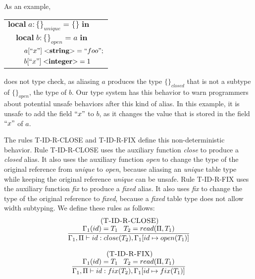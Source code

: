 \documentclass{sigplanconf}
\newcommand{\Integer}{\mathbf{integer}}
\newcommand{\String}{\mathbf{string}}
\newcommand{\mylabel}[1]{\; (\textsc{#1})}
\newcommand{\env}{\Gamma}
\newcommand{\penv}{\Pi}
\begin{document}
As an example,
\begin{center}
\begin{tabular}{lll}
\multicolumn{3}{l}{$\mathbf{local} \; a:\{\}_{unique} = \{\} \; \mathbf{in}$}\\
& \multicolumn{2}{l}{$\mathbf{local} \; b:\{\}_{open} = a \; \mathbf{in}$}\\
& & \multicolumn{1}{l}{$a[``x"] \; {<}\String{>} = ``foo";$}\\
& & \multicolumn{1}{l}{$b[``x"] \; {<}\Integer{>} = 1$}\\
\end{tabular}
\end{center}
does not type check, as aliasing $a$ produces the type $\{\}_{closed}$
that is not a subtype of $\{\}_{open}$, the type of $b$.
Our type system has this behavior to warn programmers about
potential unsafe behaviors after this kind of alias.
In this example, it is unsafe to add the field $``x"$ to $b$,
as it changes the value that is stored in the field $``x"$ of $a$.

The rules \textsc{T-ID-R-CLOSE} and \textsc{T-ID-R-FIX} define this non-deterministic behavior.
Rule \textsc{T-ID-R-CLOSE} uses the auxiliary function \emph{close} to
produce a \emph{closed} alias.
It also uses the auxiliary function \emph{open} to change the type of
the original reference from \emph{unique} to \emph{open},
because aliasing an \emph{unique} table type while keeping the original
reference \emph{unique} can be unsafe.
Rule \textsc{T-ID-R-FIX} uses the auxiliary function \emph{fix} to
produce a \emph{fixed} alias.
It also uses \emph{fix} to change the type of the original reference
to \emph{fixed}, because a \emph{fixed} table type does not allow
width subtyping.
We define these rules as follows:
\[
\begin{array}{c}
\begin{array}{c}
\mylabel{T-ID-R-CLOSE}\\
\dfrac{\env_{1}(id) = T_{1} \;\;\; T_{2} = read(\penv, T_{1})}
      {\env_{1}, \penv \vdash id:close(T_{2}), \env_{1}[id \mapsto open(T_{1})]}
\end{array}
\\ \\
\begin{array}{c}
\mylabel{T-ID-R-FIX}\\
\dfrac{\env_{1}(id) = T_{1} \;\;\; T_{2} = read(\penv, T_{1})}
      {\env_{1}, \penv \vdash id:fix(T_{2}), \env_{1}[id \mapsto fix(T_{1})]}
\end{array}
\end{array}
\]
\end{document}
